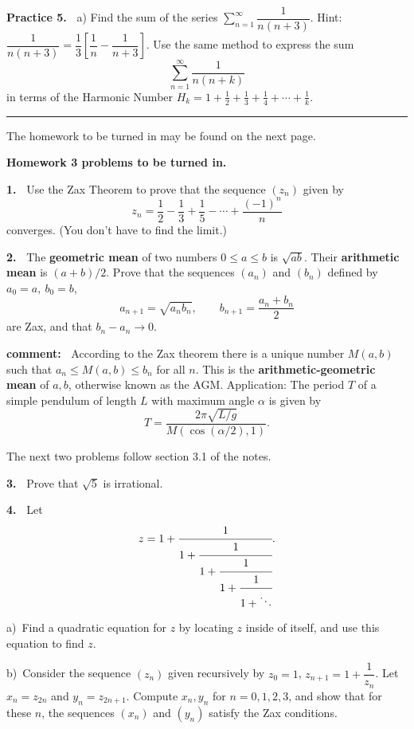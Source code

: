 \documentclass[12pt]{article}
\newcommand{\al}{\alpha}
\theoremstyle{definition}
\theoremstyle{remark}
\theoremstyle{definition}
\newenvironment{Solution}{\noindent\textbf{Solution.}}{}
\begin{document}
{\bf Practice 5.\ } a) Find the sum of the  series
$\sum\limits_{n=1}^\infty\dfrac{1}{n(n+3)}$. 
Hint:$ \dfrac{1}{n(n+3)}=\dfrac{1}{3}\left[\dfrac{1}{n}-\dfrac{1}{n+3}\right]$.
Use the same method to express the sum 
\[\sum_{n=1}^\infty\frac{1}{n(n+k)}\]
in terms of the Harmonic Number $H_k=1+\frac{1}{2}+\frac{1}{3}+\frac{1}{4}+\cdots+\frac{1}{k}$. 


 \rule{\textwidth}{1pt}
The homework to be turned in may be found on the next page.


\newpage

{\bf Homework 3 problems to be turned in.}

{\bf 1.\ } Use the Zax Theorem to prove that the sequence $(z_n)$ given by 
\[z_n=\frac{1}{2}-\frac{1}{3}+\frac{1}{5}-\cdots+\frac{(-1)^n}{n}
\] 
converges. (You don't have to find the limit.) 

{\bf 2.\ }  The  {\bf geometric mean} of two numbers $0\leq a\leq b$ is $\sqrt{ab}$. Their {\bf arithmetic mean} is $(a+b)/2$.
Prove that the sequences $(a_n)$ and $(b_n)$ defined by $a_0=a,\ b_0=b$, 
\[a_{n+1}=\sqrt{a_nb_n},\qquad b_{n+1}=\frac{a_n+b_n}{2}\]
are Zax, and that $b_n-a_n\to 0$. 

{\bf comment:\ } According to the Zax theorem there is a unique number $M(a,b)$ such that $a_n\leq M(a,b)\leq b_n$ for all $n$. This is the {\bf arithmetic-geometric mean} of $a,b$, otherwise known as the AGM. Application: The period $T$ of a simple pendulum of length $L$  with maximum angle $\al$ is given by 
\[T=\frac{2\pi\sqrt{L/g}}{M(\cos(\al/2),1)}.
\]


The next two problems follow section 3.1 of the notes. 

{\bf 3.\ } Prove that $\sqrt{5}$ is irrational.


\vskip10pt

{\bf 4.\ } Let
\[z=
1+\cfrac {1}{1+ \cfrac{ 1}{1+ \cfrac{ 1}{1+ \cfrac{ 1}{1+ \ddots}}}} .
\]

a)\ Find a quadratic equation for $z$ by locating $z$ inside of itself, and use this equation to find $z$.

b)\  Consider the sequence $(z_n)$ given recursively by $z_0=1$, $z_{n+1}=1+\dfrac{1}{z_n}$. 
Let $x_n=z_{2n}$ and $y_n=z_{2n+1}$. Compute $x_n, y_n$ for $n=0,1,2,3$, and show that for these $n$, the sequences $(x_n)$ and $(y_n)$ satisfy the Zax conditions. 
\end{document}

